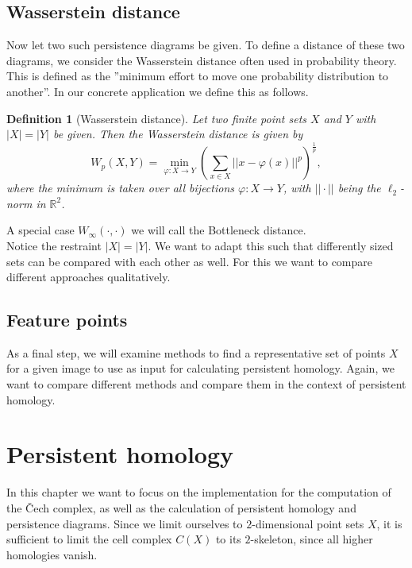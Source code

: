 \documentclass[11pt, a4paper, UKenglish]{article}
\newtheorem{definition}{Definition}
\newcommand{\bR}{\mathbb{R}}
\begin{document}
    \subsection{Wasserstein distance}\label{subsec:wasserstein-distance}

    Now let two such persistence diagrams be given.
    To define a distance of these two diagrams, we consider the Wasserstein distance often used in probability theory.
    This is defined as the ''minimum effort to move one probability distribution to another''.
    In our concrete application we define this as follows.
    \begin{definition}[Wasserstein distance]
        Let two finite point sets $X$ and $Y$ with $|X|=|Y|$ be given.
        Then the Wasserstein distance is given by\[W_p(X,Y) = \min_{\varphi:X\rightarrow Y}\left(\sum_{x\in X}||x-\varphi(x)||^p\right)^{\frac{1}{p}},\]
        where the minimum is taken over all bijections $\varphi:X\rightarrow Y$, with $||\cdot||$ being the $\ell_2$-norm in $\bR^2$.
    \end{definition}
    A special case $W_\infty(\cdot,\cdot)$ we will call the Bottleneck distance.\\
    Notice the restraint $|X| = |Y|$.
    We want to adapt this such that differently sized sets can be compared with each other as well.
    For this we want to compare different approaches qualitatively.

    \subsection{Feature points}\label{subsec:feature-proposals}

    As a final step, we will examine methods to find a representative set of points $X$ for a given image to use as input for calculating persistent homology.
    Again, we want to compare different methods and compare them in the context of persistent homology.
    \section{Persistent homology}\label{sec:persistent-homology2}

    In this chapter we want to focus on the implementation for the computation of the Čech complex, as well as the calculation of persistent homology and persistence diagrams. Since we limit ourselves to $2$-dimensional point sets $X$, it is sufficient to limit the cell complex $C(X)$ to its $2$-skeleton, since all higher homologies vanish.
\end{document}
